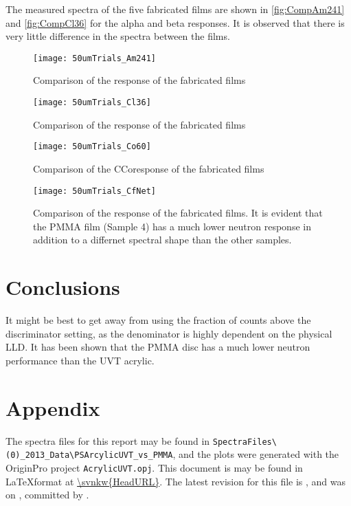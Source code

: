 \documentclass[draftcls,onecolumn]{IEEEtran}
\begin{document}
The measured spectra of the five fabricated films are shown in \autoref{fig:CompAm241} and \autoref{fig:CompCl36} for the alpha and beta responses.
It is observed that there is very little difference in the spectra between the films.
\begin{figure}
  \centering
  \texttt{[image: 50umTrials\_Am241]}
  \caption[Fabricated Film Comparison (Alpha)]{Comparison of the  response of the fabricated films}
  \label{fig:CompAm241}
\end{figure}
\begin{figure}
  \centering
  \texttt{[image: 50umTrials\_Cl36]}
  \caption[Fabricated Film Comparison (Beta)]{Comparison of the  response of the fabricated films}
  \label{fig:CompCl36}
\end{figure}
\begin{figure}
  \centering
  \texttt{[image: 50umTrials\_Co60]}
  \caption[Fabricated Film Comparison (Gamma)]{Comparison of the \iso[60]C{Co}response of the fabricated films}
  \label{fig:CompCo60}
\end{figure}
\begin{figure}
  \centering
  \texttt{[image: 50umTrials\_CfNet]}
  \caption[Fabricated Film Comparison (Neutron)]{Comparison of the  response of the fabricated films. It is evident that the PMMA film (Sample 4) has a much lower neutron response in addition to a differnet spectral shape than the other samples.}
  \label{fig:CompCf252}
\end{figure}
\section{Conclusions}

It might be best to get away from using the fraction of counts above the discriminator setting, as the denominator is highly dependent on the physical LLD.
It has been shown that the PMMA disc has a much lower neutron performance than the UVT acrylic.

\pagebreak
\section{Appendix}
The spectra files for this report may be found in \texttt{SpectraFiles\textbackslash(0)\_2013\_Data\textbackslash PSArcylicUVT\_vs\_PMMA}, and the plots were generated with the OriginPro project \texttt{AcrylicUVT.opj}.
This document is may be found in \LaTeX format at \url{\svnkw{HeadURL}}.  
The latest revision for this file is \svnrev, and was on \svndate, committed by \svnauthor.
\end{document}
